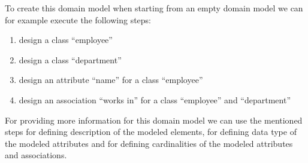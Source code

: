 To create this domain model when starting from an empty domain model we can for example execute the following steps:

\begin{enumerate}
\item design a class ``employee''
\item design a class ``department''
\item design an attribute ``name'' for a class ``employee''
\item design an association ``works in'' for a class ``employee'' and ``department''
\end{enumerate}

For providing more information for this domain model we can use the mentioned steps for defining description of the modeled elements, for defining data type of the modeled attributes and for defining cardinalities of the modeled attributes and associations.